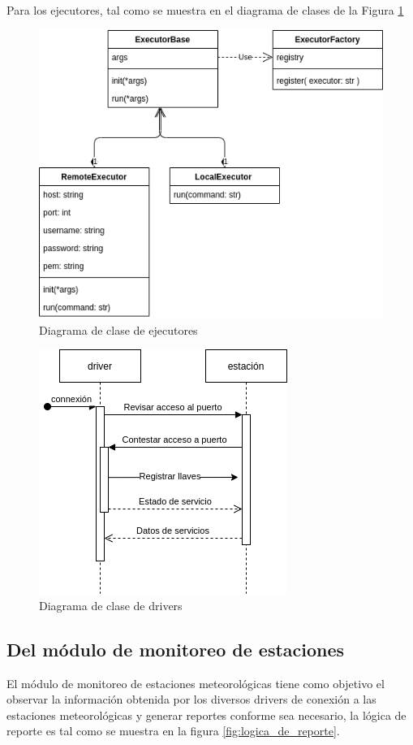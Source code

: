 Para los ejecutores, tal como se muestra en el diagrama de clases de la Figura \ref*{fig:diagrama_clase_ejecutores}

\begin{figure}[!ht]
	\centering
	\includegraphics[width=0.6\linewidth]{images/diagrams/classes/executors.drawio.png}
	\caption{Diagrama de clase de ejecutores}
	\label{fig:diagrama_clase_ejecutores}
\end{figure}




\begin{figure}[!ht]
	\centering
	\includegraphics[width=0.5\linewidth]{images/diagrams/classes/registering_execution.drawio.png}
	\caption{Diagrama de clase de drivers}
	\label{fig:diagrama_de_ejecución}
\end{figure}


\subsection{Del módulo de monitoreo de estaciones}

El módulo de monitoreo de estaciones meteorológicas tiene como objetivo el observar la información obtenida por los diversos drivers de conexión a las estaciones meteorológicas y generar reportes conforme sea necesario, la lógica de reporte es tal como se muestra en la figura \ref{fig:logica_de_reporte}.

